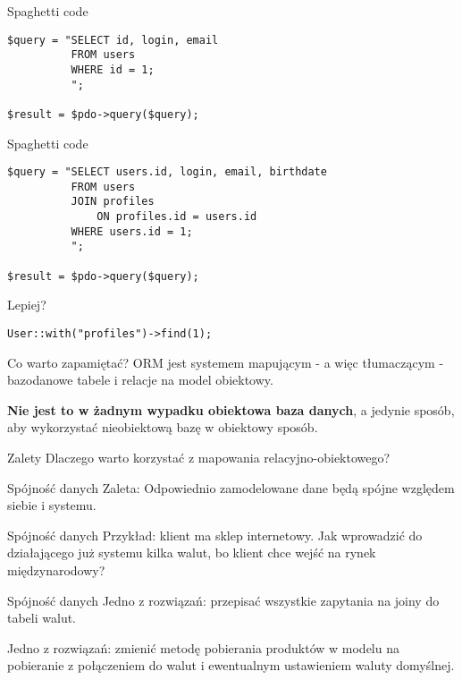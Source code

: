 \begin{frame}[fragile]{Spaghetti code}
	\begin{lstlisting}	
$query = "SELECT id, login, email
          FROM users
          WHERE id = 1;
          ";

$result = $pdo->query($query);
	\end{lstlisting}
\end{frame}

\begin{frame}[fragile]{Spaghetti code}
	\begin{lstlisting}	
$query = "SELECT users.id, login, email, birthdate
          FROM users
          JOIN profiles
              ON profiles.id = users.id
          WHERE users.id = 1;
          ";

$result = $pdo->query($query);
	\end{lstlisting}
\end{frame}

\begin{frame}[fragile]{Lepiej?}
	\begin{lstlisting}	
User::with("profiles")->find(1);
	\end{lstlisting}
\end{frame}

\begin{frame}{Co warto zapamiętać?}	
	ORM jest systemem mapującym - a więc tłumaczącym - bazodanowe tabele i relacje na model obiektowy. 
	
	\textbf{Nie jest to w żadnym wypadku obiektowa baza danych}, a jedynie sposób, aby wykorzystać nieobiektową bazę w obiektowy sposób.
\end{frame}

\begin{frame}{Zalety}	
	Dlaczego warto korzystać z mapowania relacyjno-obiektowego?
\end{frame}

\begin{frame}{Spójność danych}
	Zaleta: Odpowiednio zamodelowane dane będą spójne względem siebie i systemu.
\end{frame}

\begin{frame}{Spójność danych}	
	Przykład: klient ma sklep internetowy. Jak wprowadzić do działającego już systemu kilka walut, bo klient chce wejść na rynek międzynarodowy?
\end{frame}

\begin{frame}{Spójność danych}	
	Jedno z rozwiązań: przepisać wszystkie zapytania na joiny do tabeli walut.
	
	Jedno z rozwiązań: zmienić metodę pobierania produktów w modelu na pobieranie z połączeniem do walut i ewentualnym ustawieniem waluty domyślnej.
\end{frame}

